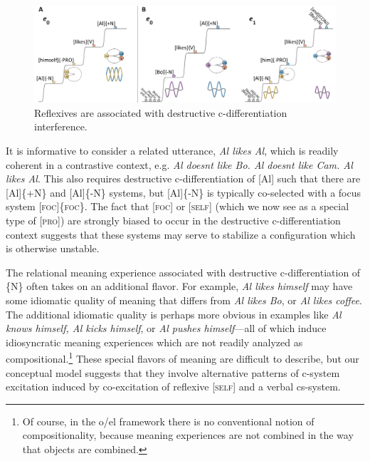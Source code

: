 \ea\label{ex:7:15}
 \label{ex:7:15a} 
  \label{ex:7:15b}
\z
\z
  
\begin{figure}
\includegraphics[width=\textwidth]{figures/Tilsen-img156.png}
\caption{Reflexives are associated with destructive c-differentiation interference.}
\label{fig:7:12}
\end{figure}
 

  It is informative to consider a related utterance, \textit{Al likes Al}, which is readily coherent in a contrastive context, e.g. \textit{Al doesnt like Bo. Al doesnt like Cam. Al likes Al}. This also requires destructive c-differentiation of [Al] such that there are [Al]\{+N\} and [Al]\{-N\} systems, but [Al]\{-N\} is typically co-selected with a focus system [\textsc{foc}]\{\textsc{foc}\}. The fact that [\textsc{foc}] or [\textsc{self}] (which we now see as a special type of [\textsc{pro}]) are strongly biased to occur in the destructive c-differentiation context suggests that these systems may serve to stabilize a configuration which is otherwise unstable.

  The relational meaning experience associated with destructive c-differentiation of \{N\} often takes on an additional flavor. For example, \textit{Al likes himself} may have some idiomatic quality of meaning that differs from \textit{Al likes Bo}, or \textit{Al likes coffee}. The additional idiomatic quality is perhaps more obvious in examples like \textit{Al knows himself, Al kicks himself}, or \textit{Al pushes himself}—all of which induce idiosyncratic meaning experiences which are not readily analyzed as compositional.\footnote{Of course, in the o/el framework there is no conventional notion of compositionality, because meaning experiences are not combined in the way that objects are combined.} These special flavors of meaning are difficult to describe, but our conceptual model suggests that they involve alternative patterns of c-system excitation induced by co-excitation of reflexive [\textsc{self}] and a verbal cs-system.

